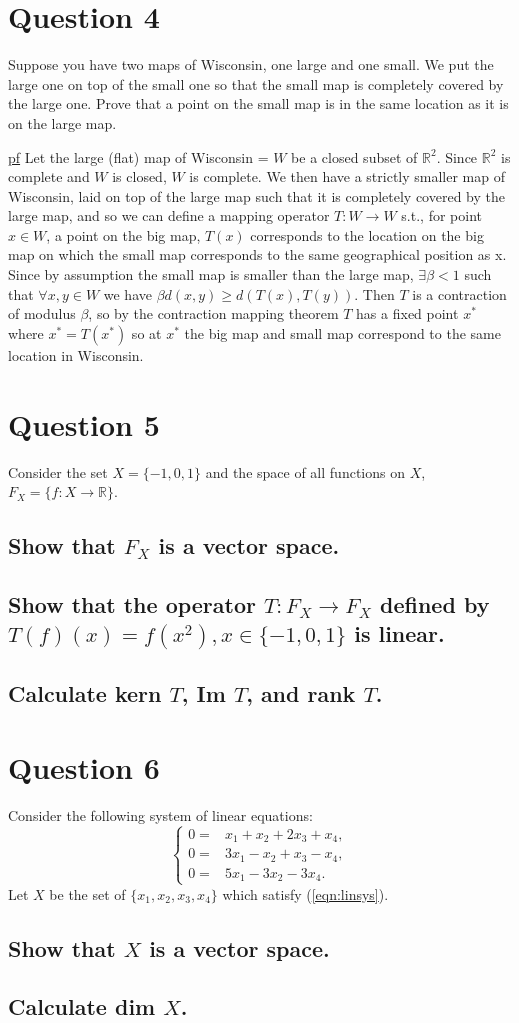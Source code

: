 \documentclass[11pt]{article} %
\begin{document}
\section{Question 4}
Suppose you have two maps of Wisconsin, one large and one small. We put the large one on top of the small one so that the small map is completely covered by the large one. Prove that a point on the small map is in the same location as it is on the large map.

\underline{pf} Let the large (flat) map of Wisconsin = $W$ be a closed subset of $\mathbb{R}^2$. Since $\mathbb{R}^2$ is complete and $W$ is closed, $W$ is complete. We then have a strictly smaller map of Wisconsin, laid on top of the large map such that it is completely covered by the large map, and so we can define a mapping operator $T: W \rightarrow W$ s.t., for point $x \in W$, a point on the big map, $T(x)$ corresponds to the location on the big map on which the small map corresponds to the same geographical position as x. Since by assumption the small map is smaller than the large map, $\exists \beta <1$ such that $\forall x,y \in W$ we have $\beta d(x,y)\geq d(T(x),T(y)).$ Then $T$ is a contraction of modulus $\beta$, so by the contraction mapping theorem $T$ has a fixed point $x^*$ where $x^* = T(x^*)$ so at $x^*$ the big map and small map correspond to the same location in Wisconsin.

\section{Question 5}
Consider the set $X = \{ -1, 0, 1 \}$ and the space of all functions on $X$, $F_X = \{ f: X \rightarrow \mathbb{R} \}$.

\subsection{Show that $F_X$ is a vector space.}
\subsection{Show that the operator $T: F_X \rightarrow F_X$ defined by $T(f)(x) = f(x^2), x \in \{ -1,0,1\}$ is linear.}
\subsection{Calculate kern $T$, Im $T$, and rank $T$.}
\section{Question 6}
Consider the following system of linear equations:
\begin{equation}
\begin{cases}
0=& x_1 + x_2 + 2x_3 + x_4, \\
0=&3x_1 - x_2 + x_3 - x_4, \\
0=&5x_1 - 3x_2 - 3x_4. \label{eqn:linsys}
\end{cases}
\end{equation}
Let $X$ be the set of $\{ x_1,x_2,x_3,x_4 \}$ which satisfy (\ref{eqn:linsys}).
\subsection{Show that $X$ is a vector space.}
\subsection{Calculate dim $X$.}
\end{document}
